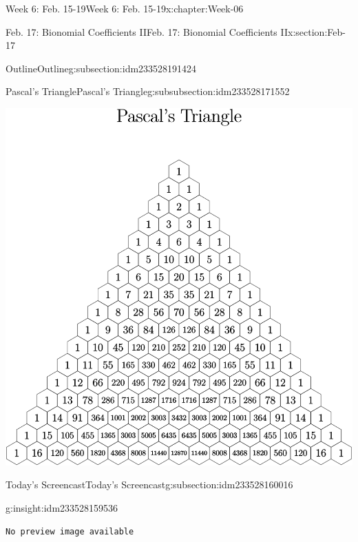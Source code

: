 \documentclass[oneside,10pt,]{book}
\newcommand{\mono}[1]{\texttt{#1}}
\numberwithin{equation}{section}
\newlength{\qrsize}
\newlength{\previewwidth}
\begin{document}
\begin{chapterptx}{Week 6: Feb. 15-19}{}{Week 6: Feb. 15-19}{}{}{x:chapter:Week-06}
\begin{sectionptx}{Feb. 17: Bionomial Coefficients II}{}{Feb. 17: Bionomial Coefficients II}{}{}{x:section:Feb-17}
\begin{subsectionptx}{Outline}{}{Outline}{}{}{g:subsection:idm233528191424}
\begin{subsubsectionptx}{Pascal's Triangle}{}{Pascal's Triangle}{}{}{g:subsubsection:idm233528171552}
\begin{sidebyside}{1}{0}{0}{0}
\begin{sbspanel}{1}
\includegraphics[width=\linewidth]{./img/pascal-large.svg}
\end{sbspanel}%
\end{sidebyside}%
\end{subsubsectionptx}
\end{subsectionptx}
%
%
\typeout{************************************************}
\typeout{************************************************}
%
\begin{subsectionptx}{Today's Screencast}{}{Today's Screencast}{}{}{g:subsection:idm233528160016}
\begin{insight}{}{g:insight:idm233528159536}%
\setlength{\qrsize}{9em}
\setlength{\previewwidth}{\linewidth}
\addtolength{\previewwidth}{-\qrsize}
\begin{tcbraster}[raster columns=2, raster column skip=1pt, raster halign=center, raster force size=false, raster left skip=0pt, raster right skip=0pt]%
\begin{tcolorbox}[previewstyle, width=\previewwidth]%
\mono{No preview image available}%
\end{tcolorbox}%
\begin{tcolorbox}[qrstyle]%
[QR LINK]\end{tcolorbox}%
\end{tcbraster}%

\end{insight}
\end{subsectionptx}
\end{sectionptx}
\end{chapterptx}
\end{document}
